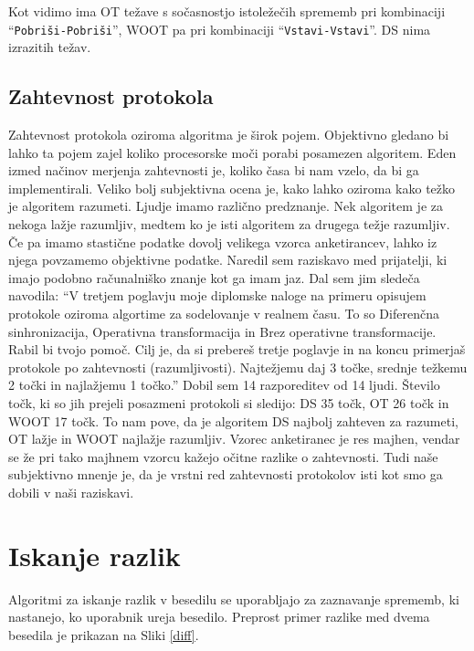 \documentclass[a4paper, 12pt, twoside]{book}
\begin{document}
Kot vidimo ima OT težave s sočasnostjo istoležečih sprememb pri kombinaciji “{\tt Pobriši-Pobriši}”, WOOT pa pri kombinaciji “{\tt Vstavi-Vstavi}”. DS nima izrazitih težav.

\section{Zahtevnost protokola}

Zahtevnost protokola oziroma algoritma je širok pojem. Objektivno gledano bi lahko ta pojem zajel koliko procesorske moči porabi posamezen algoritem. Eden izmed načinov merjenja zahtevnosti je, koliko časa bi nam vzelo, da bi ga implementirali. Veliko bolj subjektivna ocena je, kako lahko oziroma kako težko je algoritem razumeti. Ljudje imamo različno predznanje. Nek algoritem je za nekoga lažje razumljiv, medtem ko je isti algoritem za drugega težje razumljiv. Če pa imamo stastične podatke dovolj velikega vzorca anketirancev, lahko iz njega povzamemo objektivne podatke. Naredil sem raziskavo med prijatelji, ki imajo podobno računalniško znanje kot ga imam jaz. Dal sem jim sledeča navodila: “V tretjem poglavju moje diplomske naloge na primeru opisujem protokole oziroma algortime za sodelovanje v realnem času. To so Diferenčna sinhronizacija, Operativna transformacija in Brez operativne transformacije. Rabil bi tvojo pomoč. Cilj je, da si prebereš tretje poglavje in na koncu primerjaš protokole po zahtevnosti (razumljivosti). Najtežjemu daj 3 točke, srednje težkemu 2 točki in najlažjemu 1 točko.” Dobil sem 14 razporeditev od 14 ljudi. Število točk, ki so jih prejeli posazmeni protokoli si sledijo: DS 35 točk, OT 26 točk in WOOT 17 točk. To nam pove, da je algoritem DS najbolj zahteven za razumeti, OT lažje in WOOT najlažje razumljiv. Vzorec anketiranec je res majhen, vendar se že pri tako majhnem vzorcu kažejo očitne razlike o zahtevnosti. Tudi naše subjektivno mnenje je, da je vrstni red zahtevnosti protokolov isti kot smo ga dobili v naši raziskavi.

\chapter{Iskanje razlik}
\label{chp:diff}

Algoritmi za iskanje razlik v besedilu se uporabljajo za zaznavanje sprememb, ki nastanejo, ko uporabnik ureja besedilo. Preprost primer razlike med dvema besedila je prikazan na Sliki \ref{diff}.
\end{document}
